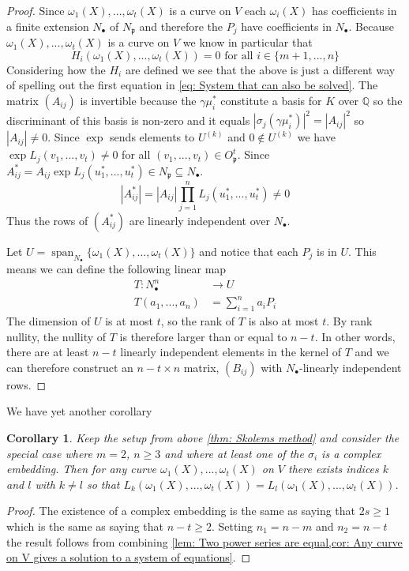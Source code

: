 \documentclass{article}
\newcommand{\Span}{\operatorname{span}}
\newtheorem{corollary}{Corollary}[section]
\newcommand{\mfrak}[1]{\mathfrak{#1}}
\newcommand{\mbb}[1]{\mathbb{#1}}
\begin{document}
\begin{proof}
    Since $\omega_1(X), ..., \omega_t(X)$ is a curve on $V$ each $\omega_i(X)$ has coefficients in a finite extension $N_\bullet$ of $N_\mfrak p$ and therefore the $P_j$ have coefficients in $N_\bullet$. Because $\omega_1(X), ..., \omega_t(X)$ is a curve on $V$ we know in particular that
\begin{equation}\label{eq: Last reformulation of initial equations}
    H_i(\omega_1(X), ..., \omega_t(X)) = 0 \text{ for all } i \in \{m+1, ..., n\}
\end{equation}
Considering how the $H_i$ are defined we see that the above is just a different way of spelling out the first equation in \cref{eq: System that can also be solved}. The matrix $(A_{ij})$ is invertible because the $\gamma \mu_i^*$ constitute a basis for $K$ over $\mbb{Q}$ so the discriminant of this basis is non-zero and it equals $|\sigma_j(\gamma \mu_i^*)|^2 = |A_{ij}|^2$ so $|A_{ij}| \neq 0$. Since $\exp$ sends elements to $U^{(k)}$ and $0 \notin U^{(k)}$ we have $\exp L_j(v_1, ..., v_t) \neq 0$ for all $(v_1, ..., v_t) \in O_\mfrak p^t$. Since $A_{ij}^* = A_{ij} \exp L_j(u_1^*, ..., u_t^*) \in N_\mfrak p \subseteq N_\bullet$.
$$|A_{ij}^*| = |A_{ij}| \prod_{j = 1}^n L_j(u_1^*, ..., u_t^*) \neq 0$$  
Thus the rows of $(A_{ij}^*)$ are linearly independent over $N_\bullet$.

Let $U = \Span_{N_\bullet} \{ \omega_1(X), ..., \omega_t(X) \}$ and notice that each $P_j$ is in $U$. This means we can define the following linear map
\begin{align*}
    T : N_\bullet^n &\to U \\
    T(a_1, ..., a_n) &= \sum_{i = 1}^n a_i P_i
\end{align*}
The dimension of $U$ is at most $t$, so the rank of $T$ is also at most $t$. By rank nullity, the nullity of $T$ is therefore larger than or equal to $n-t$. In other words, there are at least $n-t$ linearly independent elements in the kernel of $T$ and we can therefore construct an $n-t \times n$ matrix, $(B_{ij})$ with $N_\bullet$-linearly independent rows. 
\end{proof}

We have yet another corollary
\begin{corollary}\label{cor: Result to prove thues theorem}
    Keep the setup from above \cref{thm: Skolems method} and consider the special case where $m = 2$, $n \geq 3$ and where at least one of the $\sigma_i$ is a complex embedding. Then for any curve $\omega_1(X), ..., \omega_t(X)$ on $V$ there exists indices $k$ and $l$ with $k \neq l$ so that $L_k(\omega_1(X), ..., \omega_t(X)) = L_l(\omega_1(X), ..., \omega_t(X))$.
\end{corollary}
\begin{proof}
    The existence of a complex embedding is the same as saying that $2s \geq 1$ which is the same as saying that $n - t \geq 2$. Setting $n_1 = n-m$ and $n_2 = n-t$ the result follows from combining \cref{lem: Two power series are equal,cor: Any curve on V gives a solution to a system of equations}.
\end{proof}
\end{document}
